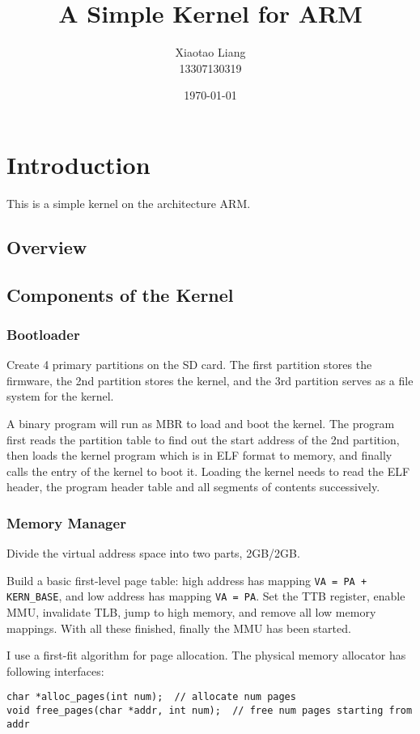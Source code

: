 \documentclass[12pt, a4paper]{article}
\title{A Simple Kernel for ARM}
\author{Xiaotao Liang \\ \small 13307130319}
\date{\today}
\begin{document}
\maketitle

\section{Introduction}
This is a simple kernel on the architecture ARM.

\subsection{Overview}

\subsection{Components of the Kernel}

\subsubsection{Bootloader}
Create 4 primary partitions on the SD card. The first partition stores the firmware, the 2nd partition stores the kernel, and the 3rd partition serves as a file system for the kernel.

A binary program will run as MBR to load and boot the kernel. The program first reads the partition table to find out the start address of the 2nd partition, then loads the kernel program which is in ELF format to memory, and finally calls the entry of the kernel to boot it. Loading the kernel needs to read the ELF header, the program header table and all segments of contents successively.

\subsubsection{Memory Manager}
Divide the virtual address space into two parts, 2GB/2GB.

Build a basic first-level page table: high address has mapping \verb|VA = PA + KERN_BASE|, and low address has mapping \verb|VA = PA|. Set the TTB register, enable MMU, invalidate TLB, jump to high memory, and remove all low memory mappings. With all these finished, finally the MMU has been started.

I use a first-fit algorithm for page allocation. The physical memory allocator has following interfaces:
\begin{lstlisting}
char *alloc_pages(int num);  // allocate num pages
void free_pages(char *addr, int num);  // free num pages starting from addr
\end{lstlisting}
\end{document}
